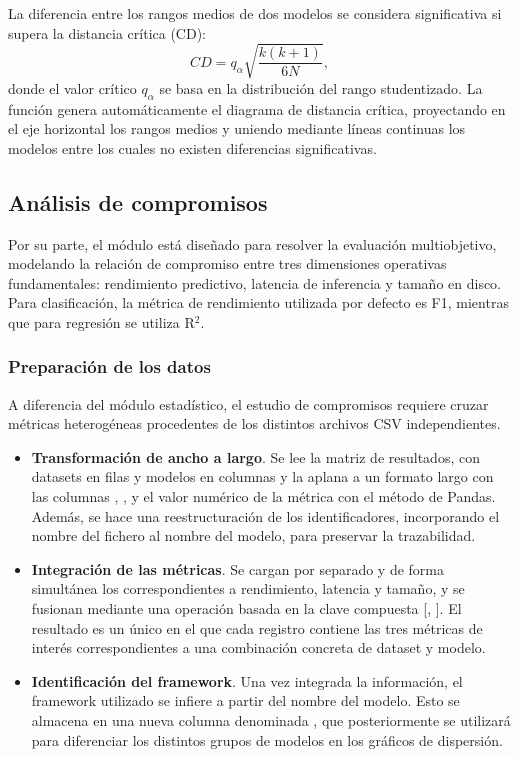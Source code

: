\documentclass[a4paper,12pt,twoside,final]{book}
\begin{document}
La diferencia entre los rangos medios de dos modelos se considera significativa si supera la distancia crítica (CD):
\[
CD = q_{\alpha} \sqrt{\frac{k(k+1)}{6N}},
\]
donde el valor crítico $q_{\alpha}$ se basa en la distribución del rango studentizado. La función  genera
automáticamente el diagrama de distancia crítica, proyectando en el eje horizontal los rangos medios y uniendo
mediante líneas continuas los modelos entre los cuales no existen diferencias significativas.

\subsection{Análisis de compromisos}
Por su parte, el módulo  está diseñado para resolver la evaluación multiobjetivo, modelando la
relación de compromiso entre tres dimensiones operativas fundamentales: rendimiento predictivo, latencia de inferencia
y tamaño en disco. Para clasificación, la métrica de rendimiento utilizada por defecto es F1, mientras que para
regresión se utiliza R$^2$.

\subsubsection{Preparación de los datos}
A diferencia del módulo estadístico, el estudio de compromisos requiere cruzar métricas heterogéneas procedentes de los
distintos archivos CSV independientes.
\begin{itemize}
  \item \textbf{Transformación de ancho a largo}. Se lee la matriz de resultados, con datasets en filas y modelos en
  columnas y la aplana a un formato largo con las columnas , , y el valor numérico de la
  métrica con el método  de Pandas. Además, se hace una reestructuración de los identificadores, incorporando
  el nombre del fichero al nombre del modelo, para preservar la trazabilidad.
  \item \textbf{Integración de las métricas}. Se cargan por separado y de forma simultánea los 
  correspondientes a rendimiento, latencia y tamaño, y se fusionan mediante una operación  basada en la
  clave compuesta [, ]. El resultado es un único  en el que cada registro
  contiene las tres métricas de interés correspondientes a una combinación concreta de dataset y modelo.
  \item \textbf{Identificación del framework}. Una vez integrada la información, el framework utilizado se infiere a
  partir del nombre del modelo. Esto se almacena en una nueva columna denominada , que posteriormente
  se utilizará para diferenciar los distintos grupos de modelos en los gráficos de dispersión.
\end{itemize}
\end{document}

